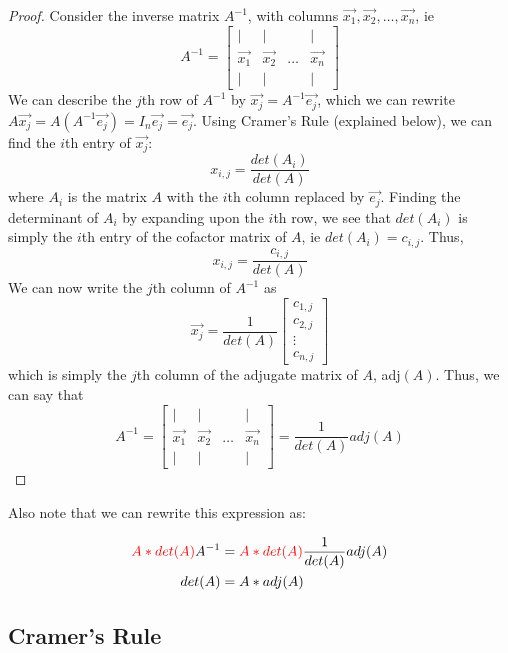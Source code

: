\documentclass[12pt]{article}
\begin{document}
{\begin{proof}
    Consider the inverse matrix $A^{-1}$, with columns $\vec{x_1}, \vec{x_2}, \dots, \vec{x_n}$, ie \[A^{-1} = 
    \begin{bmatrix} 
        | & | & &|\\
        \vec{x_1} & \vec{x_2} & \dots & \vec{x_n}\\
        | & | & &|
    \end{bmatrix}\] We can describe the $j$th row of $A^{-1}$ by $\vec{x_j} = A^{-1}\vec{e_j}$, which we can rewrite $A\vec{x_j}= A(A^{-1}\vec{e_j}) = I_n \vec{e_j} = \vec{e_j}$. Using Cramer's Rule (explained below), we can find the $i$th entry of $\vec{x_j}$: \[x_{i,j} = \frac{det(A_i)}{det(A)}\] where $A_i$ is the matrix $A$ with the $i$th column replaced by $\vec{e_j}$. Finding the determinant of $A_i$ by expanding upon the $i$th row, we see that $det(A_i)$ is simply the $i$th entry of the cofactor matrix of $A$, ie $det(A_i) = c_{i,j}$. Thus, \[x_{i,j} = \frac{c_{i,j}}{det(A)}\] We can now write the $j$th column of $A^{-1}$ as \[\vec{x_j} = \frac{1}{det(A)}\begin{bmatrix}
        c_{1,j}\\
        c_{2,j}\\
        \vdots\\
        c_{n,j}
    \end{bmatrix}\] which is simply the $j$th column of the adjugate matrix of $A$, adj$(A)$. Thus, we can say that \[A^{-1} = \begin{bmatrix} 
        | & | & & |\\
        \vec{x_1} & \vec{x_2} & \dots & \vec{x_n}\\
        | & | & & |
    \end{bmatrix} = \frac{1}{det(A)}adj(A)\]
\end{proof}

Also note that we can rewrite this expression as:

\begin{equation}
    \begin{split}
        \textcolor{red}{A*det(A)}A^{-1} &= \textcolor{red}{A*det(A)}\frac{1}{det(A)} adj(A)\\
        det(A) &= A * adj(A)\\
    \end{split}
\end{equation}

\subsection{Cramer's Rule}

}
\end{document}
